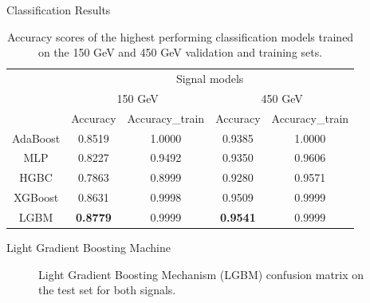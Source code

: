 \documentclass[notes]{beamer}
\begin{document}
	\begin{frame}[t]{Classification Results}
		\begin{table}[htbp!]
			\centering
			\begin{tabular}{ |c|c|c|c|c| }
				\hline \rule{0pt}{13pt}
				\multirow{2}{*}{Model} & \multicolumn{4}{c|}{Signal models} \\
				\cline{2-5} \rule{0pt}{13pt}
				 & \multicolumn{2}{c|}{150 GeV} & \multicolumn{2}{c|}{450 GeV} \\
				\cline{2-5} \rule{0pt}{13pt}
				 & Accuracy & Accuracy\_train & Accuracy & Accuracy\_train \\
				\hline \rule{0pt}{13pt}
				AdaBoost & 0.8519 & 1.0000 & 0.9385 & 1.0000 \\
				\hline \rule{0pt}{13pt}
				MLP & 0.8227 & 0.9492 & 0.9350 & 0.9606 \\
				\hline \rule{0pt}{13pt}
				HGBC & 0.7863 & 0.8999 & 0.9280 & 0.9571 \\
				\hline \rule{0pt}{13pt}
				XGBoost & 0.8631 & 0.9998 & 0.9509 & 0.9999 \\
				\hline \rule{0pt}{13pt}
				LGBM & \textbf{0.8779} & 0.9999 & \textbf{0.9541} & 0.9999\\
				\hline
			\end{tabular}	
			\caption{Accuracy scores of the highest performing classification models trained on the 150 GeV and 450 GeV validation and training sets.}
			\label{tab:Validation}
		\end{table}
	\end{frame}


	\begin{frame}[t]{Light Gradient Boosting Machine}
		\begin{figure}[h]
			\centering
			\caption{Light Gradient Boosting Mechanism (LGBM) confusion matrix on the test set for both signals.}
		\end{figure}
	\end{frame}
\end{document}
